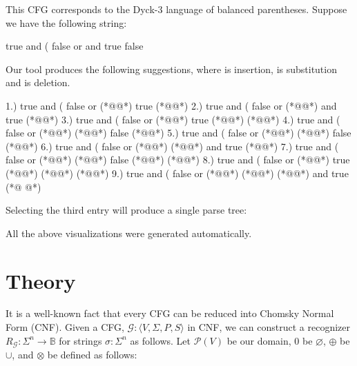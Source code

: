 \documentclass[sigplan,nonacm]{acmart}\settopmatter{printfolios=false,printccs=false,printacmref=false}
\begin{document}
\noindent This CFG corresponds to the Dyck-3 language of balanced parentheses. Suppose we have the following string:

\begin{tidyinput}
true and ( false or and true false
\end{tidyinput}

\noindent Our tool produces the following suggestions, where  is insertion,  is substitution and  is deletion.

\begin{tidyoutput}
1.) true and ( false or (*@\hlorange{!}@*) true (*@\hlorange{)}@*)
2.) true and ( false or (*@@*) and true (*@\hlorange{)}@*)
3.) true and ( false or (*@\hlorange{(}@*) true (*@\hlorange{)}@*) (*@\hlgreen{)}@*)
4.) true and ( false or (*@\hlorange{!}@*) (*@\hlorange{!}@*) false (*@\hlgreen{)}@*)
5.) true and ( false or (*@@*) (*@@*) false (*@\hlgreen{)}@*)
6.) true and ( false or (*@\hlgreen{!}@*) (*@@*) and true (*@\hlorange{)}@*)
7.) true and ( false or (*@\hlorange{!}@*) (*@\hlorange{(}@*) false (*@\hlgreen{)}@*) (*@\hlgreen{)}@*)
8.) true and ( false or (*@\hlorange{!}@*) true (*@\hlorange{)}@*) (*@@*) (*@@*)
9.) true and ( false or (*@\hlgreen{!}@*) (*@@*) (*@\hlgreen{)}@*) and true (*@ @*)
\end{tidyoutput}

\noindent Selecting the third entry will produce a single parse tree:

\begin{figure}[H]
\end{figure}

\noindent All the above visualizations were generated automatically.


\section{Theory}

It is a well-known fact that every CFG can be reduced into Chomsky Normal Form (CNF). Given a CFG, $\mathcal{G} : \langle V, \Sigma, P, S\rangle$ in CNF, we can construct a recognizer $R_\mathcal{G}: \Sigma^n \rightarrow \mathbb{B}$ for strings $\sigma: \Sigma^n$ as follows. Let $\mathcal P(V)$ be our domain, $0$ be $\varnothing$, $\oplus$ be $\cup$, and $\otimes$ be defined as follows:
\end{document}
